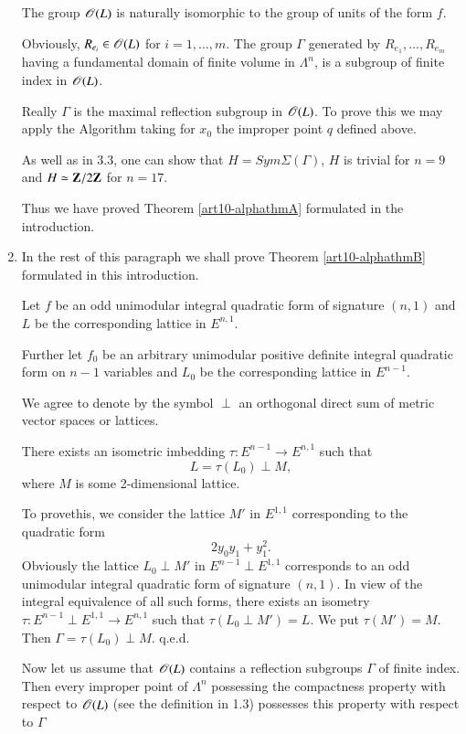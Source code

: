 \begin{enumerate}
The group $\mathscr{O}(L)$ is naturally isomorphic to the group of units of the form $f$.

Obviously, $R_{e_i} \in \mathscr{O} (L)$ for $i = 1, \ldots, m$. The group $\Gamma$ generated by $R_{e_1}, \ldots, R_{e_m}$ having a fundamental domain of finite volume in $\Lambda^n$, is a subgroup of finite index in $\mathscr{O}(L)$.

Really $\Gamma$ is the maximal reflection subgroup in $\mathscr{O} (L)$. To prove this we may apply the Algorithm taking for $x_0$ the improper point $q$ defined above.

As well as in 3.3, one can show that $H = Sym \Sigma (\Gamma)$, \ie $H$ is trivial for $n =9$ and $H \simeq \mathbf{Z} / 2 \mathbf{Z}$ for $n = 17$.

Thus we have proved Theorem \ref{art10-alphathmA} formulated in the introduction. 

\item In the rest of this paragraph we shall prove Theorem \ref{art10-alphathmB} formulated in this introduction.

Let $f$ be an odd unimodular integral quadratic form of signature $(n,1)$ and $L$ be the corresponding lattice in $E^{n,1}$.

Further let $f_0$ be an arbitrary unimodular positive definite integral quadratic form on $n-1$ variables and $L_0$ be the corresponding lattice in $E^{n-1}$.

We agree to denote by the symbol $\perp$ an orthogonal direct sum of metric vector spaces or lattices.

\setcounter{lemma}{4}
\begin{lemma}\label{art10-lem3.5}
There exists an isometric imbedding $\tau : E^{n-1} \to E^{n,1}$ such that 
$$
L = \tau (L_0) \perp M,
$$
where $M$ is some 2-dimensional lattice.
\end{lemma}

To prove\pageoriginale this, we consider the lattice $M'$ in $E^{1,1}$ corresponding to the quadratic form
\begin{equation}
2 y_0 y_1 + y^2_1. \label{art10-eq3.2} 
\end{equation}
Obviously the lattice $L_0 \perp M'$ in $E^{n-1} \perp E^{1,1}$ corresponds to an odd unimodular integral quadratic form of signature $(n,1)$. In view of the integral equivalence of all such forms, there exists an isometry $\tau : E^{n-1} \perp E^{1,1} \to E^{n,1}$ such that $\tau (L_0 \perp M') = L$. We put $\tau (M') = M$. Then $\Gamma = \tau (L_0) \perp M$. q.e.d.

Now let us assume that $\mathscr{O} (L)$ contains a reflection subgroups $\Gamma$ of finite index. Then every improper point of $\Lambda^n$ possessing the compactness property with respect to $\mathscr{O} (L)$ (see the definition in 1.3) possesses this property with respect to $\Gamma$


\end{enumerate}
